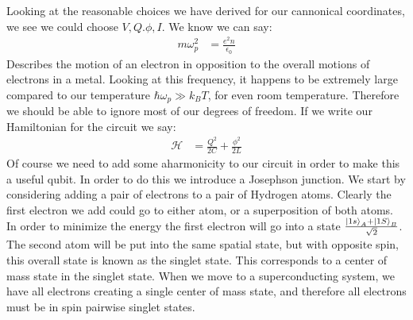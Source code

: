 Looking at the reasonable choices we have derived for our cannonical coordinates, we see we could choose $V,Q.\phi,I$. We know we can say:
\begin{align*}
	m\omega_p^2 &= \frac{e^2 n}{\epsilon_0}
\end{align*}
Describes the motion of an electron in opposition to the overall motions of electrons in a metal. Looking at this frequency, it happens to be extremely large compared to our temperature $\hbar\omega_p \gg k_B T$, for even room temperature. Therefore we should be able to ignore most of our degrees of freedom. If we write our Hamiltonian for the circuit we say:
\begin{align*}
	\mathcal{H} &= \frac{Q^2}{2C} + \frac{\phi^2}{2L}
\end{align*}
Of course we need to add some aharmonicity to our circuit in order to make this a useful qubit. In order to do this we introduce a Josephson junction. We start by considering adding a pair of electrons to a pair of Hydrogen atoms.
Clearly the first electron we add could go to either atom, or a superposition of both atoms. In order to minimize the energy the first electron will go into a state $\frac{\ket{1s}_A + \ket{1S}_B}{\sqrt{2}}$.
The second atom will be put into the same spatial state, but with opposite spin, this overall state is known as the singlet state.
This corresponds to a center of mass state in the singlet state. When we move to a superconducting system, we have all electrons creating a single center of mass state, and therefore all electrons must be in spin pairwise singlet states.

